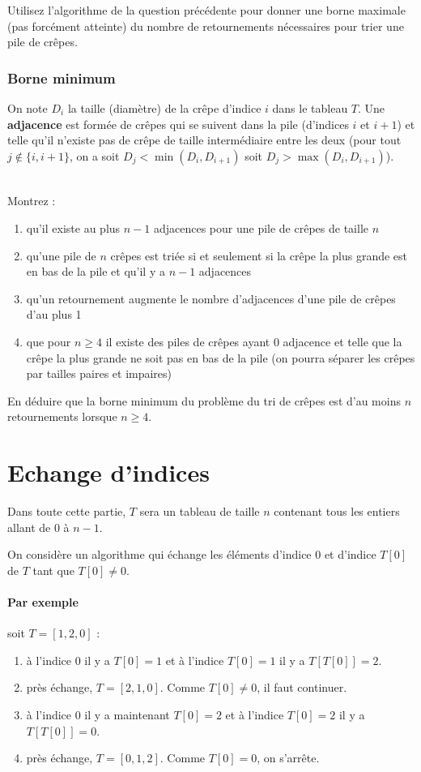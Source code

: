 \documentclass
[12pt]
{article}
\begin{document}
Utilisez l'algorithme de la question précédente pour donner une borne maximale (pas forcément atteinte) du nombre de retournements nécessaires pour trier une pile de crêpes.

\subsubsection{Borne minimum}

On note $D_i$ la taille (diamètre) de la crêpe d'indice $i$ dans le tableau $T$. 
Une {\bf adjacence} est formée de crêpes qui se suivent dans la pile (d'indices $i$ et $i+1$) et telle qu'il n'existe pas de crêpe de taille intermédiaire entre les deux (pour tout $j \notin\{i, i+1\}$, on a soit $D_{j} < \min(D_i, D_{i+1})$ soit $D_{j} > \max(D_i, D_{i+1})$). 

~\\
Montrez : 

\begin{enumerate}
    \item qu'il existe au plus $n-1$ adjacences pour une pile de crêpes de taille $n$
    \item qu'une pile de $n$ crêpes est triée si et seulement si la crêpe la plus grande est en bas de la pile et qu'il y a $n-1$ adjacences
    \item qu'un retournement augmente le nombre d'adjacences d'une pile de crêpes d'au plus 1
    \item que pour $n\geq 4$ il existe des piles de crêpes ayant 0 adjacence et telle que la crêpe la plus grande ne soit pas en bas de la pile (on pourra séparer les crêpes par tailles paires et impaires)
\end{enumerate}

En déduire que la borne minimum du problème du tri de crêpes est d'au moins $n$ retournements lorsque $n \geq 4$.

\section{Echange d'indices}

Dans toute cette partie, $T$ sera un tableau de taille $n$ contenant tous les entiers allant de $0$ à $n-1$.

On considère un algorithme qui échange les éléments d'indice $0$ et d'indice $T[0]$ de $T$ tant que $T[0] \neq 0$.

\paragraph{Par exemple} soit $T = [1, 2, 0]$ :
\begin{enumerate}
    \item à l'indice 0 il y a $T[0] = 1$ et à l'indice $T[0] = 1$ il y a $T[T[0]] = 2$.
    \item près échange, $T = [2, 1, 0]$. Comme $T[0] \neq 0$, il faut continuer.
    \item à l'indice 0 il y a maintenant $T[0] = 2$ et à l'indice $T[0] = 2$ il y a $T[T[0]] = 0$.
    \item près échange, $T = [0, 1, 2]$. Comme $T[0] = 0$, on s'arrête.
\end{enumerate}
\end{document}
